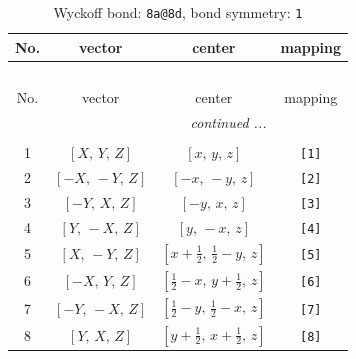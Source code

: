 \documentclass[fleqn,8pt]{jsarticle}
\begin{document}
\begin{longtable}{cccc}
\caption{Wyckoff bond: {\tt 8a@8d}, bond symmetry: {\tt 1}}
 \\
 \hline \hline
No. & vector & center & mapping \\ \hline \endfirsthead

\multicolumn{3}{l}{\tablename\ \thetable{}} \\
 \hline \hline
No. & vector & center & mapping \\ \hline \endhead

 \hline \hline
\multicolumn{3}{r}{\footnotesize\it continued ...} \\ \endfoot

 \hline \hline
\multicolumn{3}{r}{} \\ \endlastfoot

1 & $\left[ X,\, Y,\, Z \right]$ & $\left[ x,\, y,\, z \right]$ & {\tt [1]} \\ \hline
2 & $\left[ - X,\, - Y,\, Z \right]$ & $\left[ - x,\, - y,\, z \right]$ & {\tt [2]} \\ \hline
3 & $\left[ - Y,\, X,\, Z \right]$ & $\left[ - y,\, x,\, z \right]$ & {\tt [3]} \\ \hline
4 & $\left[ Y,\, - X,\, Z \right]$ & $\left[ y,\, - x,\, z \right]$ & {\tt [4]} \\ \hline
5 & $\left[ X,\, - Y,\, Z \right]$ & $\left[ x + \frac{1}{2},\, \frac{1}{2} - y,\, z \right]$ & {\tt [5]} \\ \hline
6 & $\left[ - X,\, Y,\, Z \right]$ & $\left[ \frac{1}{2} - x,\, y + \frac{1}{2},\, z \right]$ & {\tt [6]} \\ \hline
7 & $\left[ - Y,\, - X,\, Z \right]$ & $\left[ \frac{1}{2} - y,\, \frac{1}{2} - x,\, z \right]$ & {\tt [7]} \\ \hline
8 & $\left[ Y,\, X,\, Z \right]$ & $\left[ y + \frac{1}{2},\, x + \frac{1}{2},\, z \right]$ & {\tt [8]} \\
\end{longtable}
\end{document}
